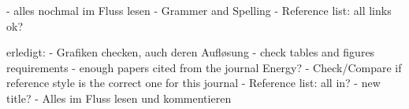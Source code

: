 - alles nochmal im Fluss lesen
- Grammer and Spelling
- Reference list: all links ok?

erledigt:
- Grafiken checken, auch deren Aufløsung
- check tables and figures requirements
- enough papers cited from the journal Energy?
- Check/Compare if reference style is the correct one for this journal
- Reference list: all in?
- new title?
- Alles im Fluss lesen und kommentieren
